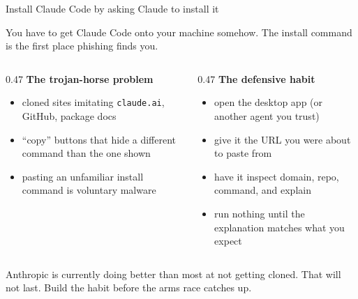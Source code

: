 \documentclass[aspectratio=169,11pt]{beamer}
\begin{document}
\begin{frame}[shrink=4]{Install Claude Code by asking Claude to install it}

You have to get Claude Code onto your machine somehow. The install command is the first place phishing finds you.

\vspace{0.25cm}

\begin{columns}[T]
\begin{column}{0.47\textwidth}
\textbf{The trojan-horse problem}
\begin{itemize}\setlength\itemsep{0.1em}
    \item cloned sites imitating \texttt{claude.ai}, GitHub, package docs
    \item ``copy'' buttons that hide a different command than the one shown
    \item pasting an unfamiliar install command is voluntary malware
\end{itemize}
\end{column}
\begin{column}{0.47\textwidth}
\textbf{The defensive habit}
\begin{itemize}\setlength\itemsep{0.1em}
    \item open the desktop app (or another agent you trust)
    \item give it the URL you were about to paste from
    \item have it inspect domain, repo, command, and explain
    \item run nothing until the explanation matches what you expect
\end{itemize}
\end{column}
\end{columns}

\vspace{0.25cm}

\alert{Anthropic is currently doing better than most at not getting cloned. That will not last. Build the habit before the arms race catches up.}

\end{frame}
\end{document}
